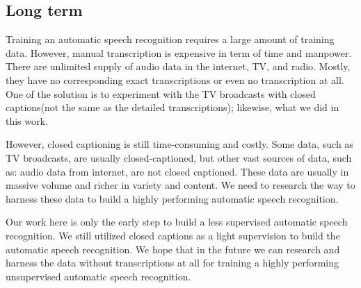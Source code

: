 \subsection{Long term}
Training an automatic speech recognition requires a large amount of training data. However, manual transcription is expensive in term of time and manpower. There are unlimited supply of audio data in the internet, TV, and radio. Mostly, they have no corresponding exact transcriptions or even no transcription at all. One of the solution is to experiment with the TV broadcasts with closed captions(not the same as the detailed transcriptions); likewise, what we did in this work. 

However, closed captioning is still time-consuming and costly. Some data, such as TV broadcasts, are usually closed-captioned, but other vast sources of data, such as: audio data from internet, are not closed captioned. These data are usually in massive volume and richer in variety and content. We need to research the way to harness these data to build a highly performing automatic speech recognition.

 Our work here is only the early step to build a less supervised automatic speech recognition. We still utilized closed captions as a light supervision to build the   automatic speech recognition. We hope that in the future we can research and harness the data without transcriptions at all for training a highly performing unsupervised automatic speech recognition.